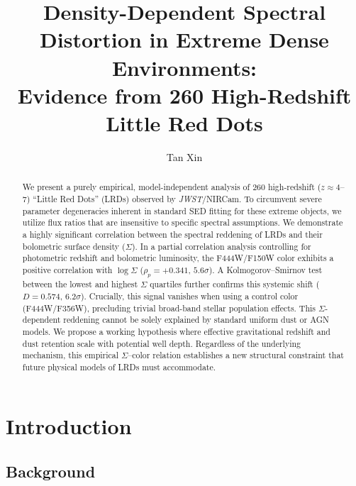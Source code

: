 \documentclass[apjl,twocolumn,longbibliography,linenumbers]{aastex701}
\begin{document}
\title{\textbf{Density-Dependent Spectral Distortion in Extreme Dense Environments:\\
Evidence from 260 High-Redshift Little Red Dots}}

\author{Tan Xin}


\begin{abstract}
We present a purely empirical, model-independent analysis of 260
high-redshift ($z \approx 4$--$7$) ``Little Red Dots'' (LRDs)
observed by \textit{JWST}/NIRCam.
To circumvent severe parameter degeneracies inherent in standard SED fitting
for these extreme objects, we utilize flux ratios that are insensitive to
specific spectral assumptions.
We demonstrate a highly significant correlation between the spectral reddening
of LRDs and their bolometric surface density ($\Sigma$).
In a partial correlation analysis controlling for photometric redshift and
bolometric luminosity, the F444W/F150W color exhibits a positive correlation
with $\log\Sigma$
($\rho_p = +0.341$, $5.6\sigma$).
A Kolmogorov--Smirnov test between the lowest and highest $\Sigma$ quartiles
further confirms this systemic shift ($D = 0.574$, $6.2\sigma$).
Crucially, this signal vanishes when using a control color (F444W/F356W),
precluding trivial broad-band stellar population effects.
This $\Sigma$-dependent reddening cannot be solely explained by standard uniform
dust or AGN models.
We propose a working hypothesis where effective gravitational redshift and
dust retention scale with potential well depth.
Regardless of the underlying mechanism, this empirical $\Sigma$--color relation
establishes a new structural constraint that future physical models of LRDs
must accommodate.
\end{abstract}



\section{Introduction}

\subsection{Background}
\end{document}
